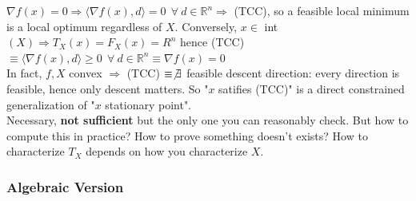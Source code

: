 \documentclass[10pt]{report}
\begin{document}
$\nabla f(x) = 0\Rightarrow \langle\nabla f(x),d\rangle = 0\:\:\forall\:d\in \mathbb{R}^n \Rightarrow$ (TCC), so a feasible local minimum is a local optimum regardless of $X$. Conversely, $x\in$ int$(X)\Rightarrow T_X(x) = F_X(x) = R^n$ hence (TCC) $\equiv\langle\nabla f(x),d\rangle \geq 0\:\:\forall\:d\in \mathbb{R}^n\equiv \nabla f(x) = 0$\\
In fact, $f,X$ convex $\Rightarrow$ (TCC) $\equiv \not\exists$ feasible descent direction: every direction is feasible, hence only descent matters. So "$x$ satifies (TCC)" is a direct constrained generalization of "$x$ stationary point".\\
Necessary, \textbf{not sufficient} but the only one you can reasonably check. But how to compute this in practice? How to prove something doesn't exists? How to characterize $T_X$ depends on how you characterize $X$.
\subsubsection{Algebraic Version}
\end{document}
